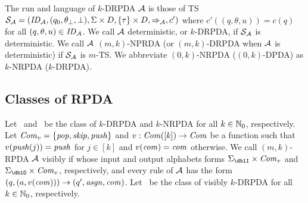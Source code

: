 The run and language of $k$-DRPDA ${\cal A}$ is those of TS
${\cal S}_{\cal A}=(\mathit{ID}_{\cal A}, (q_0, \theta_\bot, \bot), \Sigma\times D, \{\tau\}\times D, \Rightarrow_{\cal A}, c')$ where
$c'((q,\theta,u))=c(q)$ for all $(q,\theta,u)\in\mathit{ID}_{\cal A}$.
We call ${\cal A}$ deterministic, or $k$-DRPDA, if ${\cal S}_{\cal A}$ is deterministic.
We call ${\cal A}$ $(m,k)$-NPRDA (or $(m,k)$-DRPDA when ${\cal A}$ is deterministic)
if ${\cal S}_{\cal A}$ is $m$-TS.
We abbreviate $(0,k)$-NRPDA ($(0,k)$-DPDA) as $k$-NRPDA ($k$-DRPDA).

\subsection{Classes of RPDA}
Let \DRPDA\ and \NRPDA\ be the class of $k$-DRPDA and $k$-NRPDA for all $k\in\mathbb{N}_0$, respectively.
Let $\mathit{Com}_v=\{\mathit{pop},\mathit{skip},\mathit{push}\}$ and $v:\mathit{Com}([k])\to\mathit{Com}$ be a function such that $v(\mathit{push}(j))=\mathit{push}$ for $j\in[k]$ and $v(\mathit{com})=\mathit{com}$ otherwise.
We call $(m,k)$-RPDA ${\cal A}$ visibly if whose input and output alphabets forms $\Sigma_\dblI\times\Com_v$ and $\Sigma_\dblO\times\Com_v$, respectively,
and every rule of ${\cal A}$ has the form $(q,(a,v(\mathit{com})))\to(q',\mathit{asgn},\mathit{com})$.
Let \DRPDAv\ be the class of visibly $k$-DRPDA for all $k\in\mathbb{N}_0$, respectively.
